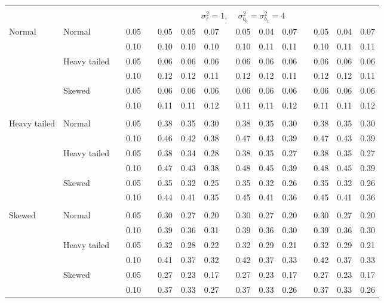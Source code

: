 \documentclass{article} %
\begin{document}
\begin{table}[ht]
\begin{scriptsize}
\begin{center}
\begin{tabular}{ll p{.1cm} c p{.1cm} rrr p{.1cm} rrr p{.1cm} rrr}
&&&&&&&&&&&&&&&\\
& && && \multicolumn{9}{c}{$\sigma_{\varepsilon}^2 = 1$, \ \ $\sigma_{b_0}^2 = \sigma_{b_1}^2 = 4$} \\ \cline{6-16}
\rowcolor{gray!20}Normal       & Normal       && 0.05 &&   0.05 & 0.05 & 0.07 && 0.05 & 0.04 & 0.07 && 0.05 & 0.04 & 0.07 \\ 
\rowcolor{gray!20}             &              && 0.10 &&   0.10 & 0.10 & 0.10 && 0.10 & 0.11 & 0.11 && 0.10 & 0.11 & 0.11 \\ 
\rowcolor{gray!20}             & Heavy tailed && 0.05 &&   0.06 & 0.06 & 0.06 && 0.06 & 0.06 & 0.06 && 0.06 & 0.06 & 0.06 \\ 
\rowcolor{gray!20}             &              && 0.10 &&   0.12 & 0.12 & 0.11 && 0.12 & 0.12 & 0.11 && 0.12 & 0.12 & 0.11 \\ 
\rowcolor{gray!20}             & Skewed       && 0.05 &&   0.06 & 0.06 & 0.06 && 0.06 & 0.06 & 0.06 && 0.06 & 0.06 & 0.06 \\ 
\rowcolor{gray!20}             &              && 0.10 &&   0.11 & 0.11 & 0.12 && 0.11 & 0.11 & 0.12 && 0.11 & 0.11 & 0.12 \\ 
             &&&&&&&&&&&&&&&\\
Heavy tailed & Normal       && 0.05 &&   0.38 & 0.35 & 0.30 && 0.38 & 0.35 & 0.30 && 0.38 & 0.35 & 0.30 \\ 
             &              && 0.10 &&   0.46 & 0.42 & 0.38 && 0.47 & 0.43 & 0.39 && 0.47 & 0.43 & 0.39 \\ 
             & Heavy tailed && 0.05 &&   0.38 & 0.34 & 0.28 && 0.38 & 0.35 & 0.27 && 0.38 & 0.35 & 0.27 \\ 
             &              && 0.10 &&   0.47 & 0.43 & 0.38 && 0.48 & 0.45 & 0.39 && 0.48 & 0.45 & 0.39 \\ 
             & Skewed       && 0.05 &&   0.35 & 0.32 & 0.25 && 0.35 & 0.32 & 0.26 && 0.35 & 0.32 & 0.26 \\ 
             &              && 0.10 &&   0.44 & 0.41 & 0.35 && 0.45 & 0.41 & 0.36 && 0.45 & 0.41 & 0.36 \\ 
             &&&&&&&&&&&&&&&\\
Skewed       & Normal       && 0.05 &&   0.30 & 0.27 & 0.20 && 0.30 & 0.27 & 0.20 && 0.30 & 0.27 & 0.20 \\ 
             &              && 0.10 &&   0.39 & 0.36 & 0.31 && 0.39 & 0.36 & 0.30 && 0.39 & 0.36 & 0.30 \\ 
             & Heavy tailed && 0.05 &&   0.32 & 0.28 & 0.22 && 0.32 & 0.29 & 0.21 && 0.32 & 0.29 & 0.21 \\ 
             &              && 0.10 &&   0.41 & 0.37 & 0.32 && 0.42 & 0.37 & 0.33 && 0.42 & 0.37 & 0.33 \\ 
             & Skewed       && 0.05 &&   0.27 & 0.23 & 0.17 && 0.27 & 0.23 & 0.17 && 0.27 & 0.23 & 0.17 \\ 
             &              && 0.10 &&   0.37 & 0.33 & 0.27 && 0.37 & 0.33 & 0.26 && 0.37 & 0.33 & 0.26 \\ 


\end{tabular}
\end{center}
\end{scriptsize}
\end{table}
\end{document}
